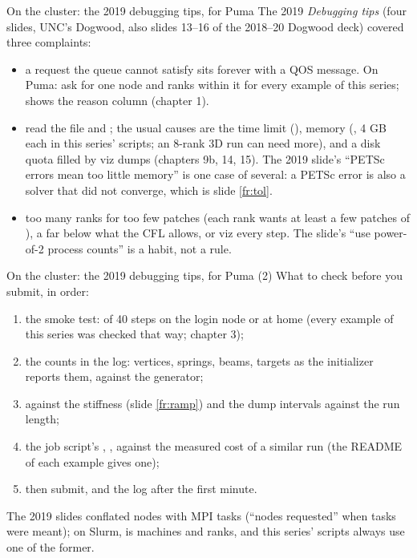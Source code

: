 \documentclass[aspectratio=169,11pt]{beamer}
\begin{document}
\begin{frame}{On the cluster: the 2019 debugging tips, for Puma}
\label{fr:cluster}
\footnotesize The 2019 \emph{Debugging tips} (four slides, UNC's Dogwood, also slides 13--16 of the 2018--20 Dogwood deck) covered three complaints:
\begin{itemize}\footnotesize
  \item {} a request the queue cannot satisfy sits forever with a QOS message. On Puma: ask for one node and  ranks within it for every example of this series;  shows the reason column (chapter 1).
  \item {} read the  file and ; the usual causes are the time limit (), memory (, 4 GB each in this series' scripts; an 8-rank 3D run can need more), and a disk quota filled by viz dumps (chapters 9b, 14, 15). The 2019 slide's ``PETSc errors mean too little memory'' is one case of several: a PETSc error is also a solver that did not converge, which is slide \ref{fr:tol}.
  \item {} too many ranks for too few patches (each rank wants at least a few patches of ), a  far below what the CFL allows, or viz every step. The slide's ``use power-of-2 process counts'' is a habit, not a rule.
\end{itemize}

\end{frame}

\begin{frame}{On the cluster: the 2019 debugging tips, for Puma (2)}
\label{fr:cluster2}
\footnotesize What to check before you submit, in order:
\begin{enumerate}\footnotesize
  \item the smoke test:  of 40 steps on the login node or at home (every example of this series was checked that way; chapter 3);
  \item the counts in the log: vertices, springs, beams, targets as the initializer reports them, against the generator;
  \item {} against the stiffness (slide \ref{fr:ramp}) and the dump intervals against the run length;
  \item the job script's , ,  against the measured cost of a similar run (the README of each example gives one);
  \item then submit, and  the log after the first minute.
\end{enumerate}
\scriptsize The 2019 slides conflated nodes with MPI tasks (``nodes requested'' when tasks were meant); on Slurm,  is machines and  ranks, and this series' scripts always use one of the former.
\end{frame}
\end{document}
